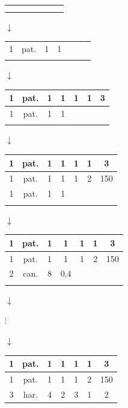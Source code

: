 \begin{center}
	
	\begin{tabular}{|c|c|c|c|c|c|c|}
		\hline &&&&&&\\
		&&&&&&\\
	\end{tabular}
	
	$\downarrow$
	
	\begin{tabular}{|c|c|c|c|c|c|c|}
		\hline 1&pat.&1&1&&&\\
		&&&&&&\\
	\end{tabular}
	
	$\downarrow$
	
	\begin{tabular}{|c|c|c|c|c|c|c|}
		\hline 1&pat.&1&1&1&1&3\\
		\hline 1&pat.&1&1&&&\\
		&&&&&&\\
	\end{tabular}
	
	$\downarrow$
	
	\begin{tabular}{|c|c|c|c|c|c|c|}
		\hline 1&pat.&1&1&1&1&3\\
		\hline 1&pat.&1&1&1&2&150\\
		\hline 1&pat.&1&1&&&\\
		&&&&&&\\
	\end{tabular}
	
	$\downarrow$
	
	\begin{tabular}{|c|c|c|c|c|c|c|}
		\hline 1&pat.&1&1&1&1&3\\
		\hline 1&pat.&1&1&1&2&150\\
		\hline 2&can.&8&0,4&&&\\
		&&&&&&\\
	\end{tabular}
	
	$\downarrow$
	
	$\vdots$
	
	$\downarrow$
	
	
	\begin{tabular}{|c|c|c|c|c|c|c|}
		\hline 1&pat.&1&1&1&1&3\\
		\hline 1&pat.&1&1&1&2&150\\
		\hline 3&har.&4&2&3&1&2\\\hline
	\end{tabular}
	
\end{center}

